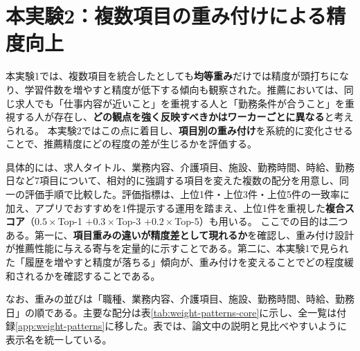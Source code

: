 \section{本実験2：複数項目の重み付けによる精度向上}
本実験1では、複数項目を統合したとしても\textbf{均等重み}だけでは精度が頭打ちになり、学習件数を増やすと精度が低下する傾向も観察された。推薦においては、同じ求人でも「仕事内容が近いこと」を重視する人と「勤務条件が合うこと」を重視する人が存在し、\textbf{どの観点を強く反映すべきかはワーカーごとに異なる}と考えられる。
本実験2ではこの点に着目し、\textbf{項目別の重み付け}を系統的に変化させることで、推薦精度にどの程度の差が生じるかを評価する。

具体的には、求人タイトル、業務内容、介護項目、施設、勤務時間、時給、勤務日など7項目について、相対的に強調する項目を変えた複数の配分を用意し、同一の評価手順で比較した。評価指標は、上位1件・上位3件・上位5件の一致率に加え、アプリでおすすめを1件提示する運用を踏まえ、上位1件を重視した\textbf{複合スコア}（$0.5\times$Top-1 $+ 0.3\times$Top-3 $+ 0.2\times$Top-5）も用いる。
ここでの目的は二つある。第一に、\textbf{項目重みの違いが精度差として現れるか}を確認し、重み付け設計が推薦性能に与える寄与を定量的に示すことである。第二に、本実験1で見られた「履歴を増やすと精度が落ちる」傾向が、重み付けを変えることでどの程度緩和されるかを確認することである。

なお、重みの並びは「職種、業務内容、介護項目、施設、勤務時間、時給、勤務日」の順である。主要な配分は表\ref{tab:weight-patterns-core}に示し、全一覧は付録\ref{app:weight-patterns}に移した。表では、論文中の説明と見比べやすいように表示名を統一している。

